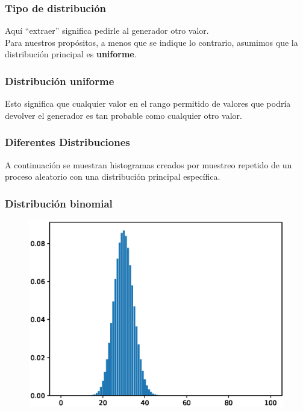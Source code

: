 \documentclass[12pt]{beamer}
\begin{document}
\begin{frame}
\frametitle{Tipo de distribución}
Aquí \enquote{extraer} significa pedirle al generador otro valor. 
\\
\bigskip
\pause
Para nuestros propósitos, a menos que se indique lo contrario, asumimos que la distribución principal es \textbf{\textcolor{beaver!80!black}{uniforme}}.
\end{frame}
\begin{frame}
\frametitle{Distribución uniforme}
Esto significa que cualquier valor en el rango permitido de valores que podría devolver el generador es tan probable como cualquier otro valor.
\end{frame}
\begin{frame}
\frametitle{Diferentes Distribuciones}
A continuación se muestran histogramas creados por muestreo repetido de un proceso aleatorio con una distribución principal específica.
\end{frame}
\begin{frame}
\frametitle{Distribución binomial}
\begin{figure}
    \centering
    \includegraphics[scale=0.55]{Imagenes/plot_distribucion_01_binomial.eps}
\end{figure}
\end{frame}
\end{document}
